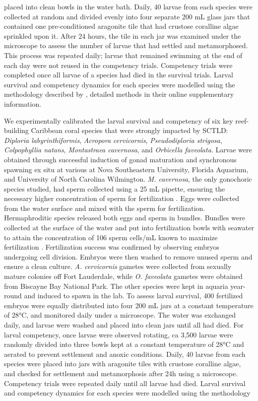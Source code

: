 \documentclass[preprint,12pt,authoryear]{elsarticle}
\begin{document}
placed into clean bowls in the water bath. Daily, 40 larvae from each species were collected at random and divided evenly into four separate 200 mL glass jars that contained one pre-conditioned aragonite tile that had crustose coralline algae sprinkled upon it. After 24 hours, the tile in each jar was examined under the microscope to assess the number of larvae that had settled and metamorphosed. This process was repeated daily; larvae that remained swimming at the end of each day were not reused in the competency trials. Competency trials were completed once all larvae of a species had died in the survival trials. Larval survival and competency dynamics for each species were modelled using the methodology described by \cite{figueiredo2022global}, detailed methods in their online supplementary information.

We experimentally calibrated the larval survival and competency of six key reef-building Caribbean coral species that were strongly impacted by SCTLD: \textit{Diploria labyrinthiformis}, \textit{Acropora cervicornis}, \textit{Pseudodiploria strigosa}, \textit{Colpophyllia natans}, \textit{Montastraea cavernosa}, and \textit{Orbicella faveolata}. Larvae were obtained through successful induction of gonad maturation and synchronous spawning ex situ at various at Nova Southeastern University, Florida Aquarium, and University of North Carolina Wilmington. \textit{M. cavernosa}, the only gonochoric species studied, had sperm collected using a 25 mL pipette, ensuring the necessary higher concentration of sperm for fertilization \citep{fogarty2012asymmetric, fogarty2012weak, dela2020optimising}. Eggs were collected from the water surface and mixed with the sperm for fertilization. Hermaphroditic species released both eggs and sperm in bundles. Bundles were collected at the surface of the water and put into fertilization bowls with seawater to attain the concentration of 106 sperm cells/mL known to maximize fertilization \citep{fogarty2012asymmetric, fogarty2012weak, dela2020optimising}. Fertilization success was confirmed by observing embryos undergoing cell division. Embryos were then washed to remove unused sperm and ensure a clean culture. \textit{A. cervicornis} gametes were collected from sexually mature colonies off Fort Lauderdale, while \textit{O. faveolata} gametes were obtained from Biscayne Bay National Park. The other species were kept in aquaria year-round and induced to spawn in the lab. To assess larval survival, 400 fertilized embryos were equally distributed into four 200 mL jars at a constant temperature of 28°C, and monitored daily under a microscope. The water was exchanged daily, and larvae were washed and placed into clean jars until all had died. For larval competency, once larvae were observed rotating, ca 3,500 larvae were randomly divided into three bowls kept at a constant temperature of 28°C and aerated to prevent settlement and anoxic conditions. Daily, 40 larvae from each species were placed into jars with aragonite tiles with crustose coralline algae, and checked for settlement and metamorphosis after 24h using a microscope. Competency trials were repeated daily until all larvae had died. Larval survival and competency dynamics for each species were modelled using the methodology 
\end{document}
